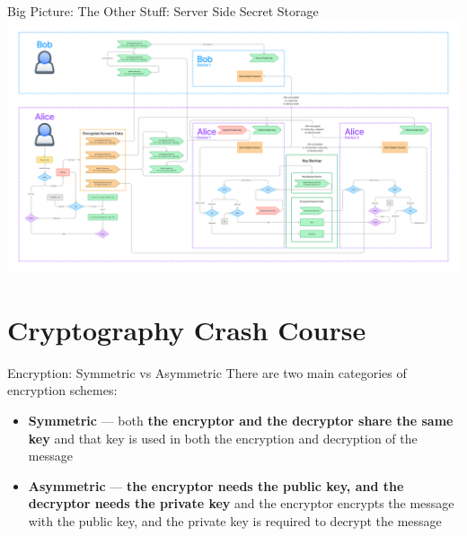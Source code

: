 \documentclass{beeper}
\begin{document}
\begin{frame}{Big Picture: The Other Stuff: Server Side Secret Storage}
    \includegraphics[width=\textwidth]{images/overview}

\end{frame}

\section{Cryptography Crash Course}

\begin{frame}{Encryption: Symmetric vs Asymmetric}
    There are two main categories of encryption schemes:

    \begin{itemize}
        \item \textbf{Symmetric} --- both \textbf{the encryptor and the
            decryptor share the same key} and that key is used in both the
            encryption and decryption of the message
            \pause
        \item \textbf{Asymmetric} --- \textbf{the encryptor needs the public
            key, and the decryptor needs the private key} and the encryptor
            encrypts the message with the public key, and the private key is
            required to decrypt the message
            \pause
    \end{itemize}
\end{frame}
\end{document}
